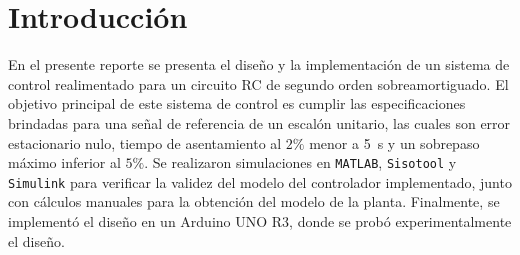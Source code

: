 
\section{Introducción}
En el presente reporte se presenta el diseño y la implementación de un sistema de control realimentado para un circuito RC de segundo orden sobreamortiguado.
El objetivo principal de este sistema de control es cumplir las especificaciones brindadas para una señal de referencia de un escalón unitario, las cuales son error estacionario nulo, tiempo de asentamiento al $2\%$ menor a \SI{5}{\second} y un sobrepaso máximo inferior al $5\%$.
Se realizaron simulaciones en \texttt{MATLAB}, \texttt{Sisotool} y \texttt{Simulink} para verificar la validez del modelo del controlador implementado, junto con cálculos manuales para la obtención del modelo de la planta.
Finalmente, se implementó el diseño en un Arduino UNO R3, donde se probó experimentalmente el diseño.

